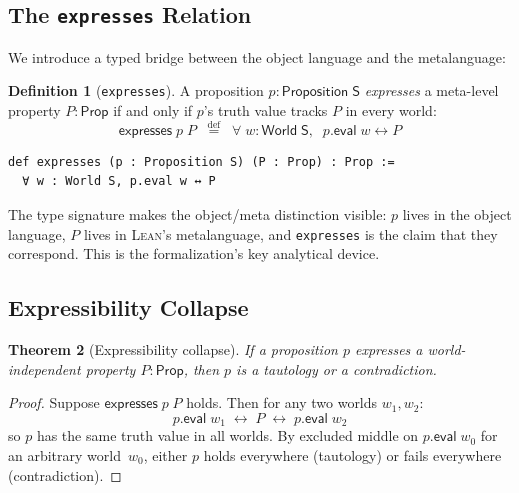 \documentclass[10pt, letterpaper]{article}
\newtheorem{theorem}{Theorem}[section]
\theoremstyle{definition}
\newtheorem{definition}[theorem]{Definition}
\theoremstyle{remark}
\newcommand{\Sach}{\mathsf{S}}
\newcommand{\World}{\mathsf{World}}
\newcommand{\Prop}{\mathsf{Prop}}
\newcommand{\eval}{\mathsf{eval}}
\newcommand{\expresses}{\mathsf{expresses}}
\newcommand{\Lean}{\textsc{Lean}}
\begin{document}
\subsection{The \texttt{expresses} Relation}
\label{sec:expresses}

We introduce a typed bridge between the object language and the
metalanguage:

\begin{definition}[\texttt{expresses}]
\label{def:expresses}
A proposition $p : \mathsf{Proposition}\;\Sach$ \emph{expresses}
a meta-level property $P : \Prop$ if and only if $p$'s truth
value tracks $P$ in every world:
\[
  \expresses\;p\;P \;\;\stackrel{\mathrm{def}}{=}\;\;
  \forall\;w : \World\;\Sach,\;\; p.\eval\;w \leftrightarrow P
\]
\end{definition}

\begin{lstlisting}
def expresses (p : Proposition S) (P : Prop) : Prop :=
  ∀ w : World S, p.eval w ↔ P
\end{lstlisting}

\noindent
The type signature makes the object/meta distinction visible:
$p$ lives in the object language, $P$ lives in \Lean's
metalanguage, and \texttt{expresses} is the claim that they
correspond.  This is the formalization's key analytical device.

\subsection{Expressibility Collapse}
\label{sec:collapse}

\begin{theorem}[Expressibility collapse]
\label{thm:collapse}
If a proposition $p$ expresses a world-independent property
$P : \Prop$, then $p$ is a tautology or a contradiction.
\end{theorem}

\begin{proof}
Suppose $\expresses\;p\;P$ holds.  Then for any two worlds
$w_1, w_2$:
\[
  p.\eval\;w_1 \;\leftrightarrow\; P \;\leftrightarrow\;
  p.\eval\;w_2
\]
so $p$ has the same truth value in all worlds.  By excluded
middle on $p.\eval\;w_0$ for an arbitrary world~$w_0$, either
$p$ holds everywhere (tautology) or fails everywhere
(contradiction).
\end{proof}
\end{document}
